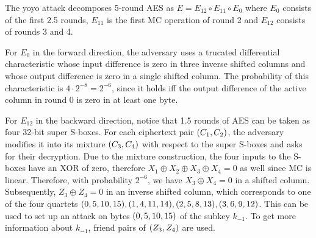 \documentclass[twoside]{article}
\begin{document}
The yoyo attack decomposes 5-round AES as \(E = E_{12} \circ E_{11} \circ E_0\)
where \(E_0\) consists of the first 2.5 rounds, \(E_{11}\) is the first MC
operation of round 2 and \(E_{12}\) consists of rounds 3 and 4. 

For \(E_0\) in the forward direction, the adversary uses a trucated differential
characteristic whose input difference is zero in three inverse shifted columns
and whose output difference is zero in a single shifted column. The probability
of this characteristic is \(4 \cdot 2^{-8} = 2^{-6}\), since it holds iff the
output difference of the active column in round 0 is zero in at least one byte.

For \(E_{12}\) in the backward direction, notice that 1.5 rounds of AES can be
taken as four 32-bit super S-boxes. For each ciphertext pair \((C_1,
C_2)\), the adversary modifies it into its mixture \((C_3, C_4)\) with
respect to the super S-boxes and asks for their decryption. Due to the mixture
construction, the four inputs to the S-boxes have an XOR of zero, therefore
\(X_1 \oplus X_2 \oplus X_3 \oplus X_4 = 0\) as well since MC is linear.
Therefore, with probability \(2^{-6}\), we have \(X_3 \oplus X_4 = 0\) in a
shifted column. Subsequently, \(Z_3 \oplus Z_4 = 0\) in an inverse shifted
column, which corresponds to one of the four quartets \((0,5,10,15),
(1,4,11,14), (2,5,8,13), (3,6,9,12)\). This can be used to set up
an attack on bytes \((0,5,10,15)\) of the subkey \(k_{-1}\). To get more
information about \(k_{-1}\), friend pairs of \((Z_3, Z_4)\) are used.
\end{document}
